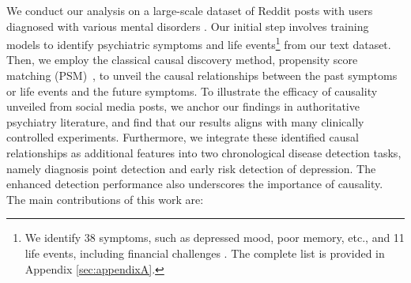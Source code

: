 We conduct our analysis on a large-scale dataset of Reddit posts with users diagnosed with various mental disorders \cite{chen-etal-2023-detection}. 
Our initial step involves training models to identify psychiatric symptoms and life events\footnote{We identify 38 symptoms, such as depressed mood, poor memory, etc., and 11 life events, including financial challenges \cite{Noone2017stress,Zhang2022SymptomIF}. The complete list is provided in Appendix \ref{sec:appendixA}.} from our text dataset. 
Then, we employ the classical causal discovery method, propensity score matching (PSM)~\cite{Rosenbaum1983TheCR}, to unveil the causal relationships between the past symptoms or life events and the future symptoms. 
To illustrate the efficacy of causality unveiled from social media posts, we anchor our findings in authoritative psychiatry literature, and find that our results aligns with many clinically controlled experiments. Furthermore, we integrate these identified causal relationships as additional features into two chronological disease detection tasks, namely diagnosis point detection and early risk detection of depression. The enhanced detection performance also underscores the importance of causality.
The main contributions of this work are:
